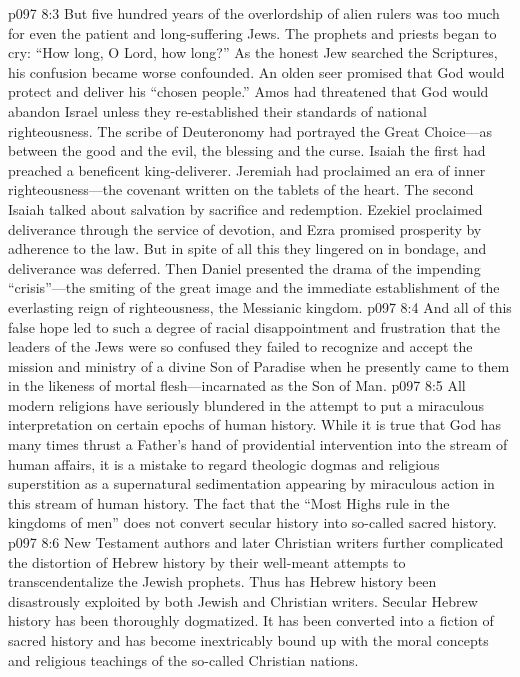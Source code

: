 \vs p097 8:3 But five hundred years of the overlordship of alien rulers was too much for even the patient and long\hyp{}suffering Jews. The prophets and priests began to cry: “How long, O Lord, how long?” As the honest Jew searched the Scriptures, his confusion became worse confounded. An olden seer promised that God would protect and deliver his “chosen people.” Amos had threatened that God would abandon Israel unless they re\hyp{}established their standards of national righteousness. The scribe of Deuteronomy had portrayed the Great Choice---as between the good and the evil, the blessing and the curse. Isaiah the first had preached a beneficent king\hyp{}deliverer. Jeremiah had proclaimed an era of inner righteousness---the covenant written on the tablets of the heart. The second Isaiah talked about salvation by sacrifice and redemption. Ezekiel proclaimed deliverance through the service of devotion, and Ezra promised prosperity by adherence to the law. But in spite of all this they lingered on in bondage, and deliverance was deferred. Then Daniel presented the drama of the impending “crisis”---the smiting of the great image and the immediate establishment of the everlasting reign of righteousness, the Messianic kingdom.
\vs p097 8:4 And all of this false hope led to such a degree of racial disappointment and frustration that the leaders of the Jews were so confused they failed to recognize and accept the mission and ministry of a divine Son of Paradise when he presently came to them in the likeness of mortal flesh---incarnated as the Son of Man.
\pc \vs p097 8:5 All modern religions have seriously blundered in the attempt to put a miraculous interpretation on certain epochs of human history. While it is true that God has many times thrust a Father’s hand of providential intervention into the stream of human affairs, it is a mistake to regard theologic dogmas and religious superstition as a supernatural sedimentation appearing by miraculous action in this stream of human history. The fact that the “Most Highs rule in the kingdoms of men” does not convert secular history into so\hyp{}called sacred history.
\vs p097 8:6 New Testament authors and later Christian writers further complicated the distortion of Hebrew history by their well\hyp{}meant attempts to transcendentalize the Jewish prophets. Thus has Hebrew history been disastrously exploited by both Jewish and Christian writers. Secular Hebrew history has been thoroughly dogmatized. It has been converted into a fiction of sacred history and has become inextricably bound up with the moral concepts and religious teachings of the so\hyp{}called Christian nations.
